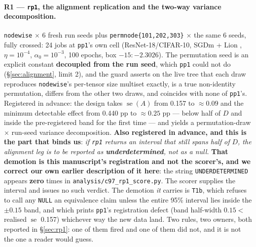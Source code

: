 \documentclass[10pt,letterpaper]{article}
\newcommand{\Dstat}{D}                         %
\newcommand{\Astat}{A}                         %
\newcommand{\arm}[1]{\texttt{#1}}
\DeclareMathOperator{\se}{se}
\begin{document}
\paragraph{R1 --- \arm{rp1}, the alignment replication and the two-way variance decomposition.}
\arm{nodewise} $\times$ 6 fresh run seeds plus \arm{permnode\{101,202,303\}} $\times$ the same 6
seeds, fully crossed: 24 jobs at \arm{pp1}'s own cell (ResNet-18/CIFAR-10, SGDm + Lion
\citep{chen2023lion}, $\eta = 10^{-4}$, $\alpha_0 = 10^{-3}$, 100 epochs, box $-15{:}-2.3026$).
The permutation seed is an explicit constant \textbf{decoupled from the run seed}, which
\arm{pp1} could not do (\S\ref{sec:alignment}, limit 2), and the guard asserts on the live tree
that each draw reproduces \arm{nodewise}'s per-tensor size multiset exactly, is a true
non-identity permutation, differs from the other two draws, and coincides with none of
\arm{pp1}'s. Registered in advance: the design takes $\se(\Astat)$ from 0.157 to
$\approx 0.09$ and the minimum detectable effect from 0.440 pp to $\approx 0.25$ pp --- below
half of $\Dstat$ and inside the pre-registered band for the first time --- and yields a
permutation-draw $\times$ run-seed variance decomposition. \textbf{Also registered in advance,
and this is the part that binds us}: \emph{if \arm{rp1} returns an interval that still spans
half of $\Dstat$, the alignment leg is to be reported as \textbf{underdetermined}, not as a
null.} \textbf{That demotion is this manuscript's registration and not the scorer's, and we
correct our own earlier description of it here}: the string \texttt{UNDERDETERMINED} appears
\textbf{zero} times in \texttt{analysis/c97\_rp1\_score.py}. The scorer supplies the interval and
issues no such verdict. The demotion \emph{it} carries is \texttt{T1b}, which refuses to call any
\texttt{NULL} an equivalence claim unless the entire 95\% interval lies inside the $\pm 0.15$
band, and which prints \arm{pp1}'s registration defect (band half-width $0.15 <$ realised $\se$
0.157) whichever way the new data land. Two rules, two owners, both reported in
\S\ref{sec:rp1}: one of them fired and one of them did not, and it is not the one a reader would
guess.
\end{document}
